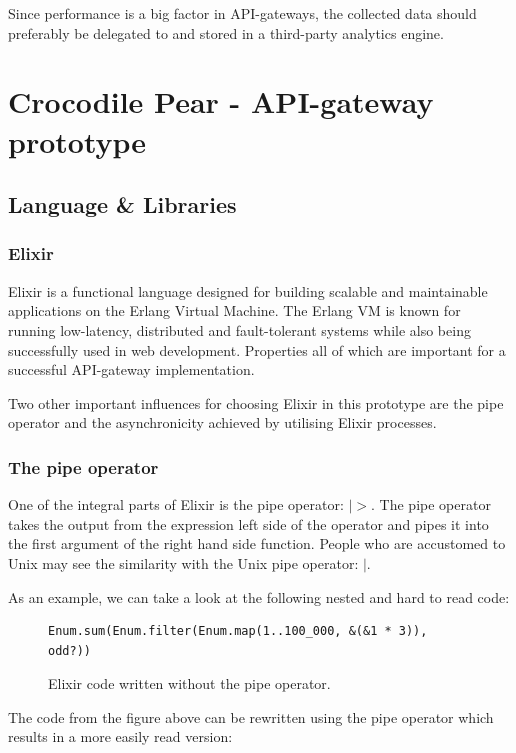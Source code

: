 \documentclass{cslthse-msc}
\begin{document}
Since performance is a big factor in API-gateways, the collected data should preferably be delegated to and stored in a third-party analytics engine.

\chapter{Crocodile Pear - API-gateway prototype}

\section{Language \& Libraries}
\subsection{Elixir}
Elixir is a functional language designed for building scalable and maintainable applications on the Erlang Virtual Machine. The Erlang VM is known for running low-latency, distributed and fault-tolerant systems while also being successfully used in web development\cite{elixir}. Properties all of which are important for a successful API-gateway implementation.

Two other important influences for choosing Elixir in this prototype are the pipe operator and the asynchronicity achieved by utilising Elixir processes.

\subsection{The pipe operator}
One of the integral parts of Elixir is the pipe operator: $|>$. The pipe operator takes the output from the expression left side of the operator and pipes it into the first argument of the right hand side function. People who are accustomed to Unix may see the similarity with the Unix pipe operator: $|$.

As an example, we can take a look at the following nested and hard to read code:

\begin{figure}[H]
  \centering
\begin{lstlisting}[breaklines=true,frame=single]
Enum.sum(Enum.filter(Enum.map(1..100_000, &(&1 * 3)), odd?))
\end{lstlisting}
  \caption{Elixir code written without the pipe operator.}
\end{figure}

The code from the figure above can be rewritten using the pipe operator which results in a more easily read version:
\end{document}
